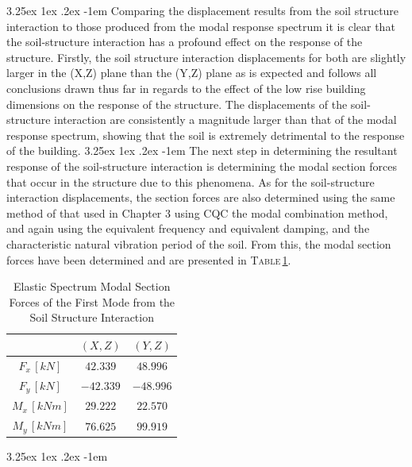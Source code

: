 \documentclass[11pt,a4paper,titlepage]{report}
\makeatletter
\renewcommand\paragraph{\@startsection{paragraph}{5}{\z@}%
  {3.25ex \@plus1ex \@minus.2ex}%
  {-1em}%
  {\normalfont\normalsize\bfseries}}
\makeatother
\begin{document}
\paragraph{}Comparing the displacement results from the soil structure interaction to those produced from the modal response spectrum it is clear that the soil-structure interaction has a profound effect on the response of the structure. Firstly, the soil structure interaction displacements for both are slightly larger in the (X,Z) plane than the (Y,Z) plane as is expected and follows all conclusions drawn thus far in regards to the effect of the low rise building dimensions on the response of the structure. The displacements of the soil-structure interaction are consistently a magnitude larger than that of the modal response spectrum, showing that the soil is extremely detrimental to the response of the building.
\paragraph{}The next step in determining the resultant response of the soil-structure interaction is determining the modal section forces that occur in the structure due to this phenomena. As for the soil-structure interaction displacements, the section forces are also determined using the same method of that used in Chapter 3 using CQC the modal combination method, and again using the equivalent frequency and equivalent damping, and the characteristic natural vibration period of the soil. From this, the modal section forces have been determined and are presented in \textsc{Table}\,\ref{tab:SSI section forces}.
\begin{table}[h]
    \centering
    \begin{tabular}{c|c|c}
    &    $(X,Z)$  & $(Y,Z)$ \\
        \hline
     $F_x\,[kN]$ & $42.339$ & $48.996$ \\
     $F_y\,[kN]$ & $-42.339$ & $-48.996$ \\
     $M_x\,[kNm]$ & $29.222$ & $22.570$ \\
     $M_y\,[kNm]$ & $76.625$ & $99.919$ \\
    \end{tabular}
    \caption{Elastic Spectrum Modal Section Forces of the First Mode from the Soil Structure Interaction}
    \label{tab:SSI section forces}
\end{table}
\paragraph{}
\end{document}
